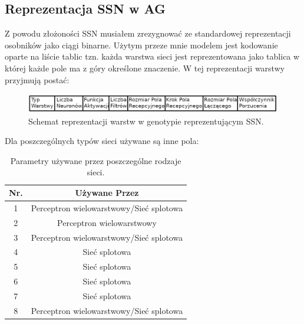 \documentclass{article}
\begin{document}
\subsection{Reprezentacja SSN w AG}
\label{sec:ossn}
Z powodu złożoności SSN musiałem zrezygnować ze standardowej reprezentacji osobników 
jako ciągi binarne. Użytym przeze mnie modelem jest kodowanie oparte na liście tablic tzn.
każda warstwa sieci jest reprezentowana jako tablica w której każde pole ma z góry określone 
znaczenie. W tej reprezentacji warstwy przyjmują postać:\\
\begin{figure}[H]
\centering
\includegraphics[scale=0.30]{dnn_genome.png}
\caption{Schemat reprezentacji warstw w genotypie reprezentującym SSN.}
\end{figure}
Dla poszczególnych typów sieci używane są inne pola:\\
\begin{table}[H]
\centering
\begin{tabular}{|c|c|}
	\hline
	Nr. & Używane Przez  \\
	\hline
	1 & Perceptron wielowarstwowy/Sieć splotowa\\%
	2 & Perceptron wielowarstwowy\\%
	3 & Perceptron wielowarstwowy/Sieć splotowa\\%
	4 & Sieć splotowa \\%
	5 & Sieć splotowa \\%
	6 & Sieć splotowa \\%
	7 & Sieć splotowa \\%
	8 & Perceptron wielowarstwowy/Sieć splotowa\\ %
	\hline
\end{tabular}
\caption{\label{tab:zakres}Parametry używane przez poszczególne rodzaje sieci.}
\end{table}
\end{document}
